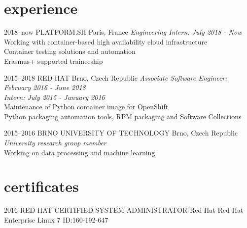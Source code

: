 \documentclass[]{friggeri-cv} %
\begin{document}

\section{experience}


\begin{entrylist}


\entry
{2018--now}
{PLATFORM.SH}
{Paris, France}
{\emph{Engineering Intern: July 2018 - Now} \\
Working with container-based high availability cloud infrastructure \\
Container testing solutions and automation \\
Erasmus+ supported traineeship}

\entry
{2015--2018}
{RED HAT}
{Brno, Czech Republic}
{\emph{Associate Software Engineer: February 2016 - June 2018} \\
\emph{Intern: July 2015 - January 2016} \\
Maintenance of Python container image for OpenShift \\
Python packaging automation tools, RPM packaging and Software Collections}


\entry
{2015--2016}
{BRNO UNIVERSITY OF TECHNOLOGY}
{Brno, Czech Republic}
{\emph{University research group member} \\
Working on data processing and machine learning}

\end{entrylist}



\section{certificates}

\begin{entrylist}


\entry
{2016}
{RED HAT CERTIFIED SYSTEM ADMINISTRATOR}
{Red Hat}
{Red Hat Enterprise Linux 7 ID:160-192-647}


\end{entrylist}
\end{document}
